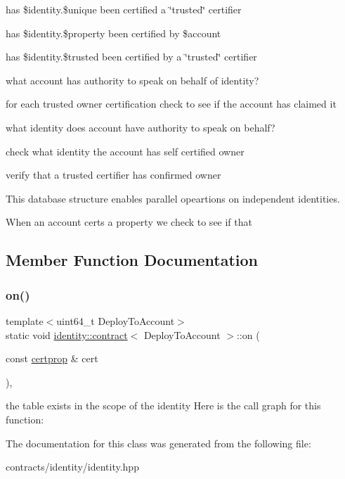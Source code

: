 \begin{DoxyEnumerate}
\item has \$identity.\$unique been certified a \char`\"{}trusted\char`\"{} certifier
\item has \$identity.\$property been certified by \$account
\item has \$identity.\$trusted been certified by a \char`\"{}trusted\char`\"{} certifier
\item what account has authority to speak on behalf of identity?
\begin{DoxyItemize}
\item for each trusted owner certification check to see if the account has claimed it
\end{DoxyItemize}
\item what identity does account have authority to speak on behalf?
\begin{DoxyItemize}
\item check what identity the account has self certified owner
\item verify that a trusted certifier has confirmed owner
\end{DoxyItemize}
\end{DoxyEnumerate}

This database structure enables parallel opeartions on independent identities.

When an account certs a property we check to see if that 

\subsection{Member Function Documentation}
\mbox{\label{classidentity_1_1contract_ae1223cdb3abe5357783ef6f516dfc7de}} 
\subsubsection{\texorpdfstring{on()}{on()}}
{\footnotesize\ttfamily template$<$uint64\+\_\+t Deploy\+To\+Account$>$ \\
static void \mbox{\hyperlink{classidentity_1_1contract}{identity\+::contract}}$<$ Deploy\+To\+Account $>$\+::on (\begin{DoxyParamCaption}\item[{const \mbox{\hyperlink{structidentity_1_1contract_1_1certprop}{certprop}} \&}]{cert }\end{DoxyParamCaption})\hspace{0.3cm}{\ttfamily [inline]}, {\ttfamily [static]}}

the table exists in the scope of the identity Here is the call graph for this function\+:


The documentation for this class was generated from the following file\+:\begin{DoxyCompactItemize}
\item 
contracts/identity/identity.\+hpp\end{DoxyCompactItemize}
